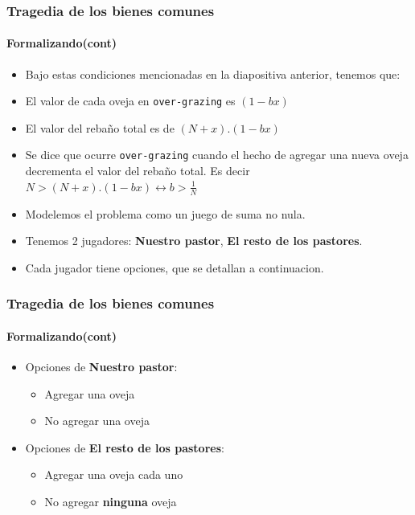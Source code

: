 \documentclass{beamer}
\begin{document}
\begin{frame}
  \frametitle{Tragedia de los bienes comunes}
  \framesubtitle{Formalizando(cont)}
  \begin{itemize}
    \setlength{\itemsep}{4pt}    
    \item Bajo estas condiciones mencionadas en la diapositiva anterior, tenemos que:
    \pause
    \item El valor de cada oveja en \texttt{over-grazing} es $(1-bx)$
    \pause 
    \item El valor del rebaño total es de $(N + x) . (1-bx)$
    \pause
    \item Se dice que ocurre \texttt{over-grazing} cuando el hecho de agregar una nueva oveja decrementa el valor del rebaño total. Es decir $ N > (N + x) . (1-bx) \longleftrightarrow b > \frac{1}{N}$
    \pause
    \item Modelemos el problema como un juego de suma no nula.
    \pause
    \item Tenemos 2 jugadores: \textbf{Nuestro pastor}, \textbf{El resto de los pastores}.
    \pause
    \item Cada jugador tiene opciones, que se detallan a continuacion.
  \end{itemize}
\end{frame}

\begin{frame}
  \frametitle{Tragedia de los bienes comunes}
  \framesubtitle{Formalizando(cont)}
  \begin{itemize}
    \setlength{\itemsep}{8pt}    
    \item Opciones de \textbf{Nuestro pastor}:
    \begin{itemize}
      \item Agregar una oveja 
      \item No agregar una oveja 
    \end{itemize}
    \pause
    \item Opciones de \textbf{El resto de los pastores}:
    \begin{itemize}
      \item Agregar una oveja cada uno
      \item No agregar \textbf{ninguna} oveja 
    \end{itemize}
    \pause

  \end{itemize}
\end{frame}
\end{document}
